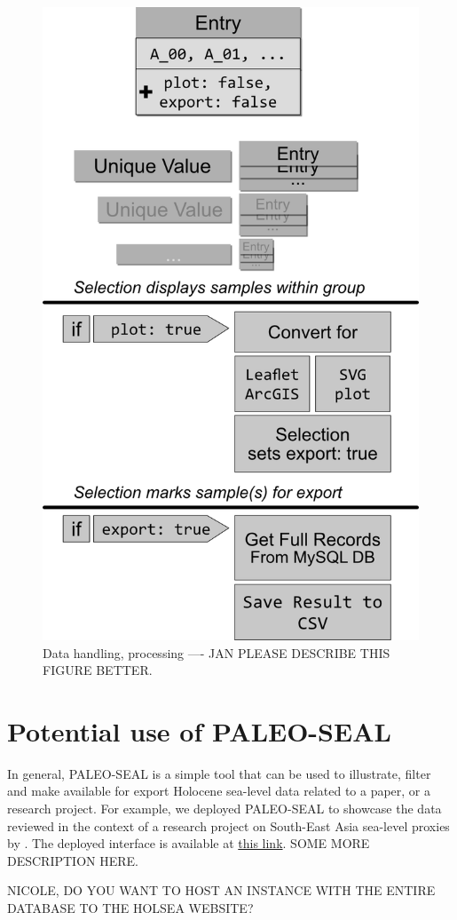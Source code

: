 \documentclass[a4paper,fleqn]{cas-dc}
\begin{document}
\begin{figure}[]
	\includegraphics{figs/FigureTechnical.png}
	\caption{Data handling, processing ---- JAN PLEASE DESCRIBE THIS FIGURE BETTER.}
	\label{fig:3}
\end{figure}


\section{Potential use of PALEO-SEAL}
In general, PALEO-SEAL is a simple tool that can be used to illustrate, filter and make available for export Holocene sea-level data related to a paper, or a research project. For example, we deployed PALEO-SEAL to showcase the data reviewed in the context of a research project on South-East Asia sea-level proxies by \citet{mann2019holocene}. The deployed interface is available at \href{https://warmcoasts.eu/paleo-seal/}{this link}. SOME MORE DESCRIPTION HERE.

NICOLE, DO YOU WANT TO HOST AN INSTANCE WITH THE ENTIRE DATABASE TO THE HOLSEA WEBSITE?

%



\end{document}
